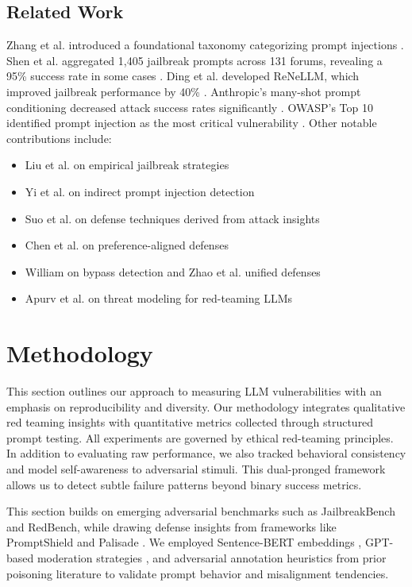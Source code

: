\documentclass[conference]{IEEEtran}
\begin{document}
\subsection{Related Work}
Zhang et al. introduced a foundational taxonomy categorizing prompt injections \cite{liu2024automatic3}. Shen et al. aggregated 1,405 jailbreak prompts across 131 forums, revealing a 95\% success rate in some cases \cite{shen2024donowcharacterizing48}. Ding et al. developed ReNeLLM, which improved jailbreak performance by 40\% \cite{ding2024wolfsheeps49}. Anthropic's many-shot prompt conditioning decreased attack success rates significantly \cite{anthropicjail18}. OWASP’s Top 10 identified prompt injection as the most critical vulnerability \cite{llmapplications16}.
\newline
Other notable contributions include:
\begin{itemize}
    \item Liu et al. on empirical jailbreak strategies \cite{liu2024jailbreaking2}
    \item Yi et al. on indirect prompt injection detection \cite{Benchmarking4}
    \item Suo et al. on defense techniques derived from attack insights \cite{chen2025defenseprompt9}
    \item Chen et al. on preference-aligned defenses \cite{chen2025secaligndefend11}
    \item William on bypass detection and Zhao et al. unified defenses \cite{hackett2025bypassing15}\cite{lin2025uniguardianunified13}
    \item Apurv et al. on threat modeling for red-teaming LLMs \cite{verma2024operation53} 
\end{itemize}

\section{Methodology}
This section outlines our approach to measuring LLM vulnerabilities with an emphasis on reproducibility and diversity. Our methodology integrates qualitative red teaming insights with quantitative metrics collected through structured prompt testing. All experiments are governed by ethical red-teaming principles. In addition to evaluating raw performance, we also tracked behavioral consistency and model self-awareness to adversarial stimuli. This dual-pronged framework allows us to detect subtle failure patterns beyond binary success metrics.

This section builds on emerging adversarial benchmarks such as JailbreakBench and RedBench, while drawing defense insights from frameworks like PromptShield \cite{jacob2025promptshield21} and Palisade \cite{kokkula2024palisade10}. We employed Sentence-BERT embeddings \cite{reimers2019sentencebert46}, GPT-based moderation strategies \cite{technicalreport17}, and adversarial annotation heuristics from prior poisoning literature \cite{wallace-etal-2021-concealed22} to validate prompt behavior and misalignment tendencies.
\end{document}
